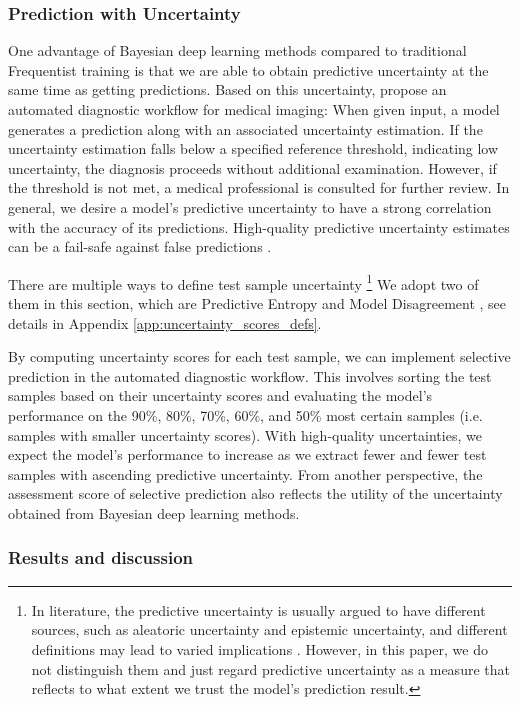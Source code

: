 \documentclass[10pt]{article} %
\begin{document}
\subsubsection{Prediction with Uncertainty}
One advantage of Bayesian deep learning methods compared to traditional Frequentist training is that we are able to obtain predictive uncertainty at the same time as getting predictions. Based on this uncertainty, \citet{band2022benchmarking} propose an automated diagnostic workflow for medical imaging: When given input, a model generates a prediction along with an associated uncertainty estimation. If the uncertainty estimation falls below a specified reference threshold, indicating low uncertainty, the diagnosis proceeds without additional examination. However, if the threshold is not met, a medical professional is consulted for further review. In general, we desire a model's predictive uncertainty to have a strong correlation with the accuracy of its predictions. High-quality predictive uncertainty estimates can be a fail-safe against false predictions 
\citep{band2022benchmarking}. 

There are multiple ways to define test sample uncertainty \footnote{In literature, the predictive uncertainty is usually argued to have different sources, such as aleatoric uncertainty and epistemic uncertainty, and different definitions may lead to varied implications \citep{ulmer2023prior, d2021repulsive}. However, in this paper, we do not distinguish them and just regard predictive uncertainty as a measure that reflects to what extent we trust the model's prediction result.} We adopt two of them in this section, which are Predictive Entropy \citep{band2022benchmarking} and Model Disagreement \citep{d2021repulsive}, see details in Appendix \ref{app:uncertainty_scores_defs}. 

By computing uncertainty scores for each test sample, we can implement selective prediction in the automated diagnostic workflow. This involves sorting the test samples based on their uncertainty scores and evaluating the model's performance on the 90\%, 80\%, 70\%, 60\%, and 50\% most certain samples (i.e. samples with smaller uncertainty scores). With high-quality uncertainties, we expect the model's performance to increase as we extract fewer and fewer test samples with ascending predictive uncertainty. From another perspective, the assessment score of selective prediction also reflects the utility of the uncertainty obtained from Bayesian deep learning methods.


\subsubsection{Results and discussion}
\end{document}
